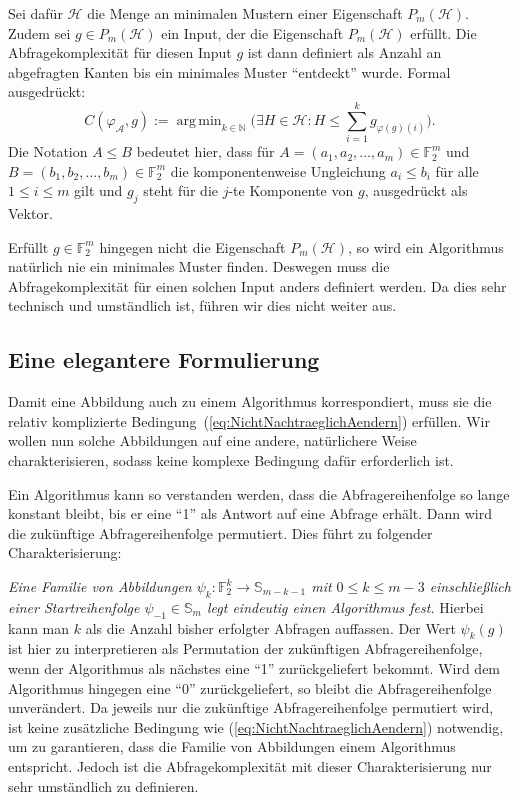 \documentclass[10pt,a4paper, footheight=1mm]{scrreprt}
\theoremstyle{definition}
\DeclareMathOperator*\argmin{arg\,min}
\begin{document}
Sei dafür $\mathcal{H}$ die Menge an minimalen
Mustern einer Eigenschaft $P_m(\mathcal{H})$.
Zudem sei $g\in P_m(\mathcal{H})$ ein Input, der die
Eigenschaft $P_m(\mathcal{H})$ erfüllt.
Die Abfragekomplexität für diesen Input $g$
ist dann definiert als Anzahl an abgefragten Kanten
bis ein minimales Muster "`entdeckt"' wurde.
Formal ausgedrückt:
$$ C(\varphi_\mathcal{A}, g) :=
\argmin_{k\in\mathbb{N}} \Big(\exists H\in\mathcal{H}:
H \leq \sum_{i=1}^k g_{\varphi(g)(i)} \Big).
$$
Die Notation $A\leq B$ bedeutet hier, dass
für $A=(a_1, a_2, \dots, a_m)\in \mathbb{F}_2^m$
und $B=(b_1, b_2, \dots, b_m)\in \mathbb{F}_2^m$
die komponentenweise Ungleichung $a_i \leq b_i$
für alle $1\leq i\leq m$ gilt und $g_j$ steht für
die $j$-te Komponente von $g$, ausgedrückt als
Vektor.

Erfüllt $g\in\mathbb{F}_2^m$ hingegen nicht die
Eigenschaft $P_m(\mathcal{H})$, so wird ein Algorithmus
natürlich nie ein minimales Muster finden. Deswegen
muss die Abfragekomplexität für einen solchen
Input anders definiert werden. Da dies sehr 
technisch und umständlich ist, führen wir
dies nicht weiter aus.

\subsection{Eine elegantere Formulierung}
Damit eine Abbildung auch zu einem Algorithmus
korrespondiert, muss sie die relativ komplizierte
Bedingung~(\ref{eq:NichtNachtraeglichAendern})
erfüllen. Wir wollen nun solche Abbildungen
auf eine andere, natürlichere
Weise charakterisieren, sodass keine komplexe Bedingung
dafür erforderlich ist.

Ein Algorithmus kann so verstanden werden, dass die
Abfragereihenfolge so lange konstant bleibt, bis er
eine "`1"' als Antwort auf eine Abfrage erhält.
Dann wird die zukünftige Abfragereihenfolge
permutiert. Dies führt zu folgender Charakterisierung:

\emph{Eine Familie von Abbildungen 
$\psi_k:\mathbb{F}_2^k \to \mathbb{S}_{m-k-1}$
mit $0 \leq k \leq m-3$ einschließlich einer Startreihenfolge
$\psi_{-1}\in\mathbb{S}_m$ legt eindeutig einen Algorithmus fest.}
Hierbei kann man $k$ als die Anzahl bisher erfolgter Abfragen
auffassen. Der Wert $\psi_k(g)$ ist hier zu interpretieren
als Permutation der zukünftigen Abfragereihenfolge, wenn
der Algorithmus als nächstes eine "`1"' zurückgeliefert bekommt.
Wird dem Algorithmus hingegen eine "`0"' zurückgeliefert, so
bleibt die Abfragereihenfolge unverändert.
Da jeweils nur die zukünftige Abfragereihenfolge permutiert 
wird, ist keine zusätzliche Bedingung wie 
(\ref{eq:NichtNachtraeglichAendern}) notwendig, um zu garantieren,
dass die Familie von Abbildungen einem Algorithmus entspricht.
Jedoch ist die Abfragekomplexität mit dieser Charakterisierung
nur sehr umständlich zu definieren.
\end{document}
